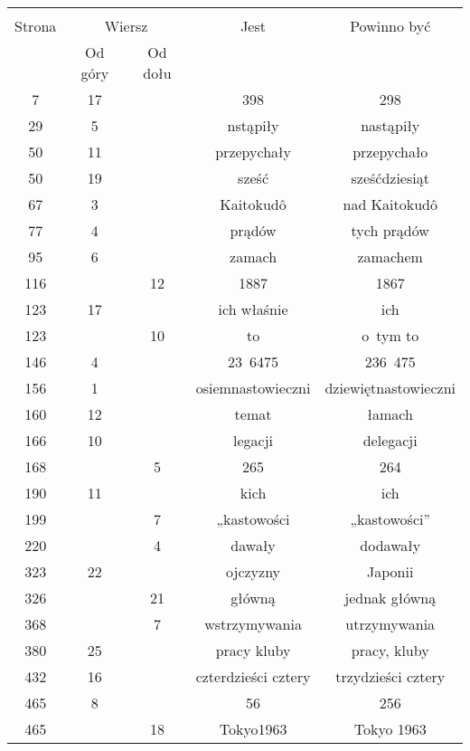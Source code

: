 \documentclass[a4paper,11pt]{article}
\begin{document}
\newpage
{}


\begin{center}

  \begin{tabular}{|c|c|c|c|c|}
    \hline
    & \multicolumn{2}{c|}{} & & \\
    Strona & \multicolumn{2}{c|}{Wiersz} & Jest
                              & Powinno być \\ \cline{2-3}
    & Od góry & Od dołu & & \\
    \hline
    7   & 17 & & 398 & 298 \\
    29  &  5 & & nstąpiły & nastąpiły \\
    50  & 11 & & przepychały & przepychało \\
    50  & 19 & & sześć & sześćdziesiąt \\
    67  &  3 & & Kaitokud\^{o} & nad Kaitokud\^{o} \\
    77  &  4 & & prądów & tych prądów \\
    95  &  6 & & zamach & zamachem \\
    116 & & 12 & 1887 & 1867 \\
    123 & 17 & & ich właśnie & ich \\
    123 & & 10 & to & o~tym to \\
    146 &  4 & & 23~6475 & 236~475 \\
    156 &  1 & & osiemnastowieczni & dziewiętnastowieczni \\
    160 & 12 & & temat & łamach \\
    166 & 10 & & legacji & delegacji \\
    168 & & 5 & 265 & 264 \\
    190 & 11 & & kich & ich \\
    199 & & 7 & „kastowości & „kastowości” \\
    220 & &  4 & dawały & dodawały \\
    323 & 22 & & ojczyzny & Japonii \\
    326 & & 21 & główną & jednak główną \\
    368 & &  7 & wstrzymywania & utrzymywania \\
    380 & 25 & & pracy kluby & pracy, kluby \\
    432 & 16 & & czterdzieści cztery & trzydzieści cztery \\
    465 &  8 & & 56 & 256 \\
    465 & & 18 & Tokyo1963 & Tokyo 1963 \\
    \hline
  \end{tabular}

\end{center}
\end{document}
